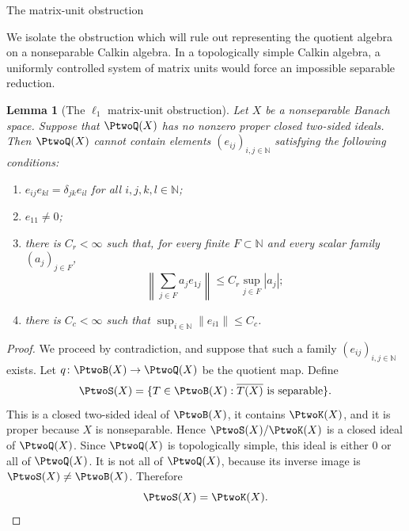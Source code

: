 \documentclass[11pt,reqno]{amsart}
\makeatletter
\theoremstyle{plain}
\newtheorem{lemma}[lemma]{Lemma}
\theoremstyle{definition}
\newcommand{\N}{\mathbb N}
\newcounter{problempaper}
\newenvironment{problempaperbody}{%
  \setcounter{subsection}{0}%
  \setcounter{subsubsection}{0}%
  \setcounter{paragraph}{0}%
  \renewcommand{\thesubsection}{\arabic{subsection}}%
  \renewcommand{\thesubsubsection}{\thesubsection.\arabic{subsubsection}}%
  \renewcommand{\theparagraph}{\thesubsubsection.\arabic{paragraph}}%
  \let\problem@outersection\section
  \let\problem@outersubsection\subsection
  \let\problem@outersubsubsection\subsubsection
  \let\problem@outerparagraph\paragraph
  \let\section\problem@papersection
  \let\subsection\problem@papersubsection
  \let\subsubsection\problem@papersubsubsection
}{%
  \let\section\problem@outersection
  \let\subsection\problem@outersubsection
  \let\subsubsection\problem@outersubsubsection
  \let\paragraph\problem@outerparagraph
}
\newcommand{\problem@target}[2]{%
  \hypertarget{problem-\theproblempaper-#1-#2}{}%
}
\newcommand{\problem@paperheading}[3]{%
  \par\bigskip
  \problem@target{#1}{#2}%
  \noindent{\large\bfseries #2.\quad #3\par}%
  \nobreak\smallskip
}
\newcommand{\problem@papersubheading}[3]{%
  \par\medskip
  \problem@target{#1}{#2}%
  \noindent{\normalsize\bfseries #2.\quad #3\par}%
  \nobreak\smallskip
}
\newcommand{\problem@papersubsubheading}[3]{%
  \par\smallskip
  \problem@target{#1}{#2}%
  \noindent{\normalsize\itshape #2.\quad #3.\ }%
}
\def\problem@papersection{%
  \@ifstar{\problem@papersectionstar}{\problem@papersectionnostar}%
}
\def\problem@papersectionstar#1{%
  \par\bigskip\noindent{\large\bfseries #1\par}\nobreak\smallskip
}
\def\problem@papersectionnostar#1{%
  \refstepcounter{subsection}%
  \setcounter{subsubsection}{0}%
  \setcounter{paragraph}{0}%
  \problem@paperheading{section}{\thesubsection}{#1}%
  \problem@writecontentsline{section}{\thesubsection}{#1}%
}
\def\problem@papersubsection{%
  \@ifstar{\problem@papersubsectionstar}{\problem@papersubsectionnostar}%
}
\def\problem@papersubsectionstar#1{%
  \par\medskip\noindent{\normalsize\bfseries #1\par}\nobreak\smallskip
}
\def\problem@papersubsectionnostar#1{%
  \refstepcounter{subsubsection}%
  \setcounter{paragraph}{0}%
  \problem@papersubheading{subsection}{\thesubsubsection}{#1}%
  \problem@writecontentsline{subsection}{\thesubsubsection}{#1}%
}
\def\problem@papersubsubsection{%
  \@ifstar{\problem@papersubsubsectionstar}{\problem@papersubsubsectionnostar}%
}
\def\problem@papersubsubsectionstar#1{%
  \par\smallskip\noindent{\normalsize\itshape #1.\ }%
}
\def\problem@papersubsubsectionnostar#1{%
  \refstepcounter{paragraph}%
  \problem@papersubsubheading{subsubsection}{\theparagraph}{#1}%
  \problem@writecontentsline{subsubsection}{\theparagraph}{#1}%
}
\newcommand{\problem@writecontentsline}[3]{%
  \begingroup
  \protected@write\@auxout{}{%
    \string\problemcontentsentry{\theproblempaper}{#1}{#2}{#3}{\thepage}%
  }%
  \endgroup
}
\newcommand{\problemcontentsentry}[5]{%
  \@ifundefined{problemcontents@#1}{%
    \expandafter\gdef\csname problemcontents@#1\endcsname{}%
  }{}%
  \expandafter\g@addto@macro\csname problemcontents@#1\endcsname{%
    \problemcontentsline{#1}{#2}{#3}{#4}{#5}%
  }%
}
\newcommand{\problemcontentslink}[4]{%
  \hyperlink{problem-#1-#2-#3}{#4}%
}
\newcommand{\problemcontentsline}[5]{%
  \ifstrequal{#2}{section}{%
    \par\noindent
    \problemcontentslink{#1}{#2}{#3}{\makebox[2.5em][l]{#3}#4}%
    \nobreak\dotfill
    \problemcontentslink{#1}{#2}{#3}{#5}\par
  }{%
    \ifstrequal{#2}{subsection}{%
      \par\noindent\hspace*{1.5em}%
      \problemcontentslink{#1}{#2}{#3}{\makebox[3.5em][l]{#3}#4}%
      \nobreak\dotfill
      \problemcontentslink{#1}{#2}{#3}{#5}\par
    }{%
      \par\noindent\hspace*{3em}%
      \problemcontentslink{#1}{#2}{#3}{\makebox[4.5em][l]{#3}#4}%
      \nobreak\dotfill
      \problemcontentslink{#1}{#2}{#3}{#5}\par
    }%
  }%
}
\makeatother
\begin{document}
\begin{problempaperbody}
\subsection{The matrix-unit obstruction}
\label{p2-first:sec:matrix-obstruction}

We isolate the obstruction which will rule out representing the quotient algebra on a nonseparable Calkin algebra. In a topologically simple Calkin algebra, a uniformly controlled system of matrix units would force an impossible separable reduction.

\begin{lemma}[The $\ell_1$ matrix-unit obstruction]
\label{p2-first:lem:matrix-obstruction}
Let $X$ be a nonseparable Banach space. Suppose that $\PtwoQ(X)$ has no nonzero proper closed two-sided ideals. Then $\PtwoQ(X)$ cannot contain elements $(e_{ij})_{i,j\in\N}$ satisfying the following conditions:
\begin{enumerate}[label=\textup{(\roman*)}]
\item\label{p2-first:matrix-obstruction:matrix-units} $e_{ij}e_{kl}=\delta_{jk}e_{il}$ for all $i,j,k,l\in\N$;
\item\label{p2-first:matrix-obstruction:nonzero-corner} $e_{11}\ne0$;
\item\label{p2-first:matrix-obstruction:row-bound} there is $C_r<\infty$ such that, for every finite $F\subset\N$ and every scalar family $(a_j)_{j\in F}$,
\begin{equation*}
        \left\|\sum_{j\in F}a_je_{1j}\right\|\leq C_r\sup_{j\in F}|a_j|;
\end{equation*}
\item\label{p2-first:matrix-obstruction:column-bound} there is $C_c<\infty$ such that $\sup_{i \in \N} \|e_{i1}\|\leq C_c$.
\end{enumerate}
\end{lemma}

\begin{proof}
We proceed by contradiction, and suppose that such a family $(e_{ij})_{i,j\in\N}$ exists. Let $q \colon \PtwoB(X)\to\PtwoQ(X)$ be the quotient map. Define
\begin{equation*}
        \PtwoS(X)=\{T\in\PtwoB(X):\overline{T(X)}\text{ is separable}\}.
\end{equation*}
This is a closed two-sided ideal of $\PtwoB(X)$, it contains $\PtwoK(X)$, and it is proper because $X$ is nonseparable. Hence $\PtwoS(X)/\PtwoK(X)$ is a closed ideal of $\PtwoQ(X)$. Since $\PtwoQ(X)$ is topologically simple, this ideal is either $0$ or all of $\PtwoQ(X)$. It is not all of $\PtwoQ(X)$, because its inverse image is $\PtwoS(X)\ne\PtwoB(X)$. Therefore
\begin{equation}
\label{p2-first:eq:separable-range-compact}
        \PtwoS(X)=\PtwoK(X).
\end{equation}


\end{proof}
\end{problempaperbody}
\end{document}
